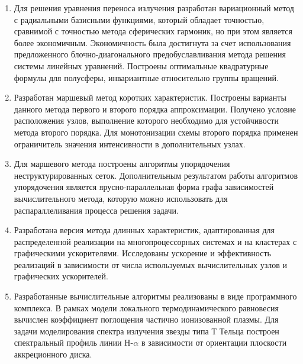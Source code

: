 \begin{enumerate}
  \item Для решения уравнения переноса излучения разработан вариационный метод с радиальными базисными функциями, который обладает точностью, сравнимой с точностью метода сферических гармоник, но при этом является более экономичным. Экономичность была достигнута за счет использования
  предложенного блочно-диагонального предобуславливания метода решения системы линейных уравнений. 
  Построены оптимальные квадратурные формулы для полусферы, инвариантные относительно группы вращений.
  \item Разработан маршевый метод коротких характеристик. Построены варианты данного метода первого и второго порядка аппроксимации. Получено условие расположения узлов, выполнение которого необходимо для устойчивости метода второго порядка. Для монотонизации схемы второго порядка применен ограничитель значения интенсивности в дополнительных узлах.
  \item Для маршевого метода построены алгоритмы упорядочения неструктурированных сеток. Дополнительным результатом работы алгоритмов упорядочения является ярусно-параллельная форма графа зависимостей вычислительного метода, которую можно использовать для распараллеливания процесса решения задачи. 
  \item Разработана версия метода длинных характеристик, адаптированная для распределенной реализации на многопроцессорных системах и на кластерах с графическими ускорителями. Исследованы ускорение и эффективность реализаций в зависимости от числа используемых вычислительных узлов и графических ускорителей.
  \item Разработанные вычислительные алгоритмы реализованы в виде программного комплекса. В рамках модели локального термодинамического равновесия вычислен коэффициент поглощения частично ионизованной плазмы. Для задачи моделирования спектра излучения звезды типа Т Тельца построен спектральный профиль линии H-$\alpha$ в зависимости от ориентации плоскости аккреционного диска.
\end{enumerate}
